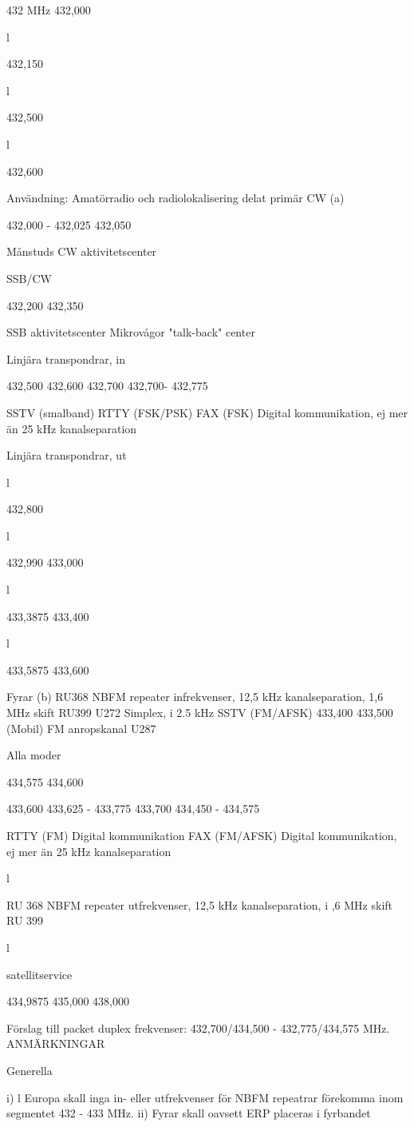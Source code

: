 432 MHz
432,000

l

432,150

l

432,500

l

432,600

Användning: Amatörradio och radiolokalisering delat primär
CW (a)

432,000 - 432,025
432,050

Månstuds
CW aktivitetscenter

SSB/CW

432,200
432,350

SSB aktivitetscenter
Mikrovågor "talk-back" center

Linjära transpondrar, in

432,500
432,600
432,700
432,700- 432,775

SSTV (smalband)
RTTY (FSK/PSK)
FAX (FSK)
Digital kommunikation, ej mer än
25 kHz kanalseparation

Linjära transpondrar, ut

l

432,800

l

432,990
433,000

l

433,3875
433,400

l

433,5875
433,600

Fyrar (b)
RU368
NBFM repeater infrekvenser, 12,5 kHz kanalseparation, 1,6 MHz skift
RU399
U272
Simplex, i 2.5 kHz
SSTV (FM/AFSK)
433,400
433,500
(Mobil) FM anropskanal
U287

Alla moder

434,575
434,600

433,600
433,625 - 433,775
433,700
434,450 - 434,575

RTTY (FM)
Digital kommunikation
FAX (FM/AFSK)
Digital kommunikation, ej mer än
25 kHz kanalseparation

l

RU 368
NBFM repeater utfrekvenser, 12,5 kHz kanalseparation, i ,6 MHz skift
RU 399

l

satellitservice

434,9875
435,000
438,000

Förslag till packet duplex frekvenser: 432,700/434,500 - 432,775/434,575 MHz.
ANMÄRKNINGAR

Generella

i) l Europa skall inga in- eller utfrekvenser för NBFM repeatrar förekomma inom segmentet 432 - 433 MHz.
ii) Fyrar skall oavsett ERP placeras i fyrbandet

